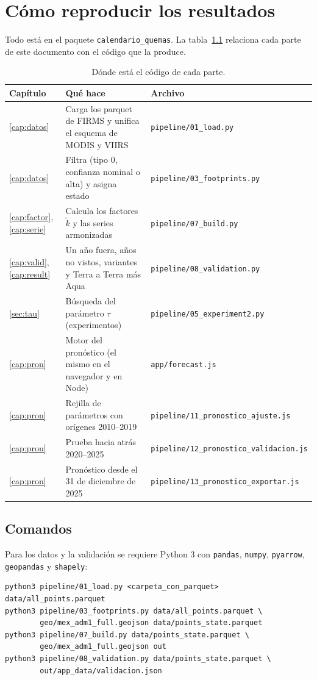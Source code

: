 \chapter{Cómo reproducir los resultados}\label{cap:repro}

Todo está en el paquete \texttt{calendario\_quemas}. La tabla~\ref{tab:scripts} relaciona cada parte de este documento con el código que la produce.

\begin{table}[H]
\centering
\caption{Dónde está el código de cada parte.}\label{tab:scripts}
\small
\begin{tabularx}{\textwidth}{@{}lXl@{}}
\toprule
Capítulo & Qué hace & Archivo \\
\midrule
\ref{cap:datos} & Carga los parquet de FIRMS y unifica el esquema de MODIS y VIIRS & \texttt{pipeline/01\_load.py} \\
\ref{cap:datos} & Filtra (tipo 0, confianza nominal o alta) y asigna estado & \texttt{pipeline/03\_footprints.py} \\
\ref{cap:factor}, \ref{cap:serie} & Calcula los factores $\widetilde k$ y las series armonizadas & \texttt{pipeline/07\_build.py} \\
\ref{cap:valid}, \ref{cap:result} & Un año fuera, años no vistos, variantes y Terra a Terra más Aqua & \texttt{pipeline/08\_validation.py} \\
\ref{sec:tau} & Búsqueda del parámetro $\tau$ (experimentos) & \texttt{pipeline/05\_experiment2.py} \\
\ref{cap:pron} & Motor del pronóstico (el mismo en el navegador y en Node) & \texttt{app/forecast.js} \\
\ref{cap:pron} & Rejilla de parámetros con orígenes 2010--2019 & \texttt{pipeline/11\_pronostico\_ajuste.js} \\
\ref{cap:pron} & Prueba hacia atrás 2020--2025 & \texttt{pipeline/12\_pronostico\_validacion.js} \\
\ref{cap:pron} & Pronóstico desde el 31 de diciembre de 2025 & \texttt{pipeline/13\_pronostico\_exportar.js} \\
\bottomrule
\end{tabularx}
\end{table}

\section{Comandos}

Para los datos y la validación se requiere Python 3 con \texttt{pandas}, \texttt{numpy}, \texttt{pyarrow}, \texttt{geopandas} y \texttt{shapely}:
\begin{verbatim}
python3 pipeline/01_load.py <carpeta_con_parquet> data/all_points.parquet
python3 pipeline/03_footprints.py data/all_points.parquet \
        geo/mex_adm1_full.geojson data/points_state.parquet
python3 pipeline/07_build.py data/points_state.parquet \
        geo/mex_adm1_full.geojson out
python3 pipeline/08_validation.py data/points_state.parquet \
        out/app_data/validacion.json
\end{verbatim}

